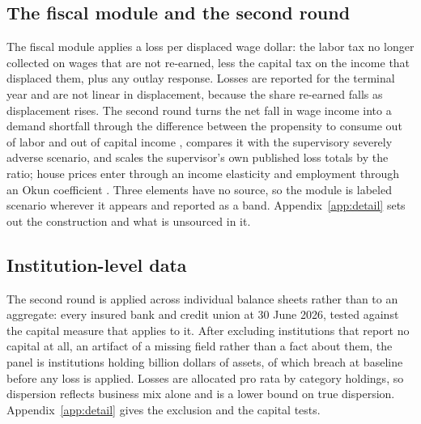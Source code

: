 \begin{table}[htbp]
\centering
\caption{Survey balances benchmarked to official aggregates, 2026:Q2. The under-reporting factor
corrects the survey; the coverage share describes the analysis sample. Rebuilt.}
\label{tab:underreporting}

\end{table}

\subsection{The fiscal module and the second round}

The fiscal module applies a loss per displaced wage dollar: the labor tax no longer collected on wages that are not re-earned, less the capital tax on the income that displaced them, plus any outlay response. Losses are reported for the terminal year and are not linear in displacement, because the share re-earned falls as displacement rises. The second round turns the net fall in wage income into a demand shortfall through the difference between the propensity to consume out of labor and out of capital income \citep{MianStraubSufi2020,FagerengHolmNatvik2021}, compares it with the supervisory severely adverse scenario, and scales the supervisor's own published loss totals by the ratio; house prices enter through an income elasticity \citep{HarterDreiman2004} and employment through an Okun coefficient \citep{BallLeighLoungani2017}. Three elements have no source, so the module is labeled scenario wherever it appears and reported as a band. Appendix~\ref{app:detail} sets out the construction and what is unsourced in it.


\subsection{Institution-level data}

The second round is applied across individual balance sheets rather than to an aggregate: every insured bank and credit union at 30 June 2026, tested against the capital measure that applies to it. After excluding  institutions that report no capital at all, an artifact of a missing field rather than a fact about them, the panel is  institutions holding  billion dollars of assets, of which  breach at baseline before any loss is applied. Losses are allocated pro rata by category holdings, so dispersion reflects business mix alone and is a lower bound on true dispersion. Appendix~\ref{app:detail} gives the exclusion and the capital tests.


